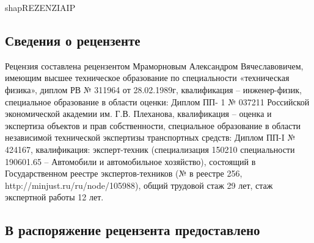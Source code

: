 \setcounter{page}{1}
%
 {shapREZENZIAIP}
%
\subsection{ Сведения о рецензенте}

Рецензия составлена рецензентом Мраморновым Александром Вячеславовичем, имеющим высшее техническое образование по специальности «техническая физика», диплом РВ № 311964 от 28.02.1989г, квалификация -- инженер-физик, специальное образование в области оценки: Диплом ПП- 1 № 037211 Российской экономической академии им. Г.В. Плеханова, квалификация -- оценка и экспертиза объектов и прав собственности, специальное образование в области независимой технической экспертизы транспортных средств: Диплом ПП-I № 424167, квалификация: эксперт-техник (специализация 150210 специальности 190601.65 -- Автомобили и автомобильное хозяйство), состоящий в Государственном реестре экспертов-техников (№ в реестре 256, http://minjust.ru/ru/node/105988),  общий трудовой  стаж 29 лет, стаж  экспертной работы  12 лет.


\subsection{В распоряжение рецензента предоставлено}

